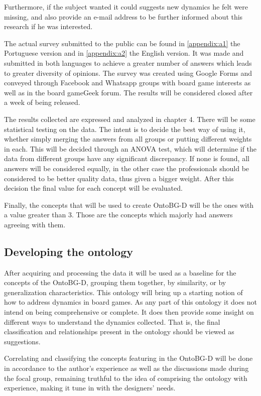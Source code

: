 Furthermore, if the subject wanted it could suggests new dynamics he felt were missing, and also provide an e-mail address to be further informed about this research if he was interested. 

The actual survey submitted to the public can be found in \autoref{appendix:a1} the Portuguese version and in \autoref{appendix:a2} the English version. It was made and submitted in both languages to achieve a greater number of answers which leads to greater diversity of opinions. The survey was created using Google Forms and conveyed through Facebook and Whatsapp groups with board game interests as well as in the board gameGeek forum. The results will be considered closed after a week of being released.

The results collected are expressed and analyzed in chapter 4. There will be some statistical testing on the data. The intent is to decide the best way of using it, whether simply merging the answers from all groups or putting different weights in each. This will be decided through an ANOVA test, which will determine if the data from different groups have any significant discrepancy. If none is found, all answers will be considered equally, in the other case the professionals should be considered to be better quality data, thus given a bigger weight. After this decision the final value for each concept will be evaluated.

Finally, the concepts that will be used to create OntoBG-D will be the ones with a value greater than 3. Those are the concepts which majorly had answers agreeing with them.

\subsection{Developing the ontology}

After acquiring and processing the data it will be used as a baseline for the concepts of the OntoBG-D, grouping them together, by similarity, or by generalization characteristics. This ontology will bring up a starting notion of how to address dynamics in board games. As any part of this ontology it does not intend on being comprehensive or complete. It does then provide some insight on different ways to understand the dynamics collected. That is, the final classification and relationships present in the ontology should be viewed as suggestions.

Correlating and classifying the concepts featuring in the OntoBG-D will be done in accordance to the author's experience as well as the discussions made during the focal group, remaining truthful to the idea of comprising the ontology with experience, making it tune in with the designers' needs.